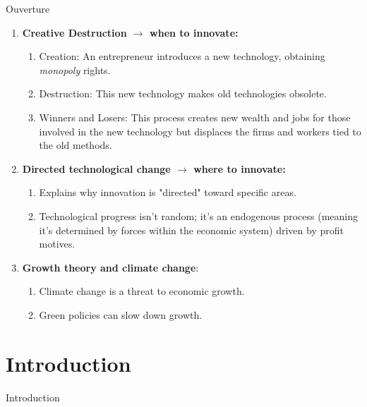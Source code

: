 \documentclass[aspectratio=169,xcolor=dvipsnames]{beamer}
\begin{document}
\begin{frame}{Ouverture}
\begin{enumerate}
    \item \textbf{Creative Destruction $\rightarrow$ when to innovate:}
    \begin{enumerate}
        \item Creation: An entrepreneur introduces a new technology, obtaining \textit{monopoly} rights.
        \item Destruction: This new technology makes old technologies obsolete.
        \item Winners and Losers: This process creates new wealth and jobs for those involved in the new technology but displaces the firms and workers tied to the old methods.
    \end{enumerate}
    \item \textbf{Directed technological change $\rightarrow$ where to innovate:}
    \begin{enumerate}
        \item Explains why innovation is "directed" toward specific areas. 
        \item Technological progress isn't random; it's an endogenous process (meaning it's determined by forces within the economic system) driven by profit motives.
    \end{enumerate}
     \item \textbf{Growth theory and climate change}:
        \begin{enumerate}
\item Climate change is a threat to economic growth.
\item Green policies can slow down growth.
        \end{enumerate}
\end{enumerate}
\end{frame}



\section{Introduction}

\begin{frame}{}
\centering
\Large Introduction
\end{frame}
\end{document}
